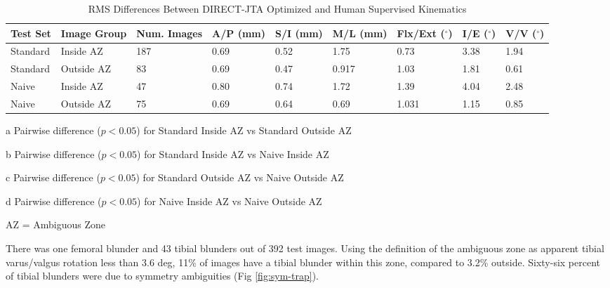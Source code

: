 \begin{table}[ht]
	\small
	\centering
	\caption{RMS Differences Between DIRECT-JTA Optimized and Human Supervised Kinematics}
	\label{tab:direct-rms}
	\begin{threeparttable}
		\begin{tabularx}{\linewidth}{|XX|X|XXXXXX|}
			\hline
			Test Set & Image Group & Num. Images & A/P (mm) & S/I (mm)      & M/L (mm)      & Flx/Ext ($^{\circ}$) & I/E ($^{\circ}$) & V/V ($^{\circ}$) \\ %
			\hline
			Standard & Inside AZ   & 187         & 0.69     & 0.52\tnote{b} & 1.75\tnote{a} & 0.73\tnote{a}        & 3.38             & 1.94\tnote{a}    \\ \hline
			Standard & Outside AZ  & 83          & 0.69     & 0.47\tnote{c} & 0.917         & 1.03                 & 1.81             & 0.61             \\ \hline
			Naive    & Inside AZ   & 47          & 0.80     & 0.74          & 1.72          & 1.39                 & 4.04             & 2.48\tnote{d}    \\ \hline
			Naive    & Outside AZ  & 75          & 0.69     & 0.64          & 0.69          & 1.031                & 1.15             & 0.85             \\ \hline
		\end{tabularx}
		\begin{tablenotes}
			\footnotesize
			\item[a] Pairwise difference ($p<0.05$) for Standard Inside AZ vs Standard Outside AZ %
			\item[b] Pairwise difference ($p<0.05$) for Standard Inside AZ vs Naive Inside AZ
			\item[c] Pairwise difference ($p<0.05$) for Standard Outside AZ vs Naive Outside AZ
			\item[d] Pairwise difference ($p<0.05$) for Naive Inside AZ vs Naive Outside AZ

			AZ = Ambiguous Zone
		\end{tablenotes}
	\end{threeparttable}
\end{table}



There was one femoral blunder and 43 tibial blunders out of 392 test images. Using the definition of the ambiguous zone as apparent tibial varus/valgus rotation less than 3.6 deg, 11\% of images have a tibial blunder within this zone, compared to 3.2\% outside. Sixty-six percent of tibial blunders were due to symmetry ambiguities (Fig \ref{fig:sym-trap}).


